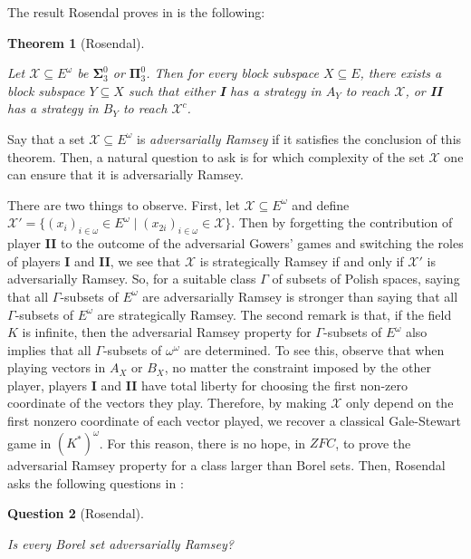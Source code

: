 \documentclass[a4paper,11pt]{article}
\newtheorem{thm}{Theorem}[section]
\newtheorem{question}[thm]{Question}
\theoremstyle{definition}
\numberwithin{equation}{section}
\newcommand{\X}{\mathcal{X}}
\newcommand{\I}{\textbf{I}}
\newcommand{\II}{\textbf{II}}
\begin{document}
The result Rosendal proves in \cite{Rosendaladverse} is the following:

\begin{thm}[Rosendal]\label{Adversarialconcrete}

Let $\X \subseteq E^\omega$ be $\boldsymbol{\Sigma}_3^0$ or $\boldsymbol{\Pi}_3^0$. Then for every block subspace $X \subseteq E$, there exists a block subspace $Y \subseteq X$ such that either \I{} has a strategy in $A_Y$ to reach $\X$, or \II{} has a strategy in $B_Y$ to reach $\X^c$.

\end{thm}

Say that a set $\X \subseteq E^\omega$ is \emph{adversarially Ramsey} if it satisfies the conclusion of this theorem. Then, a natural question to ask is for which complexity of the set $\X$ one can ensure that it is adversarially Ramsey.

\smallskip

There are two things to observe. First, let $\X \subseteq E^\omega$ and define $\X' = \{(x_i)_{i \in \omega} \in E^\omega \mid (x_{2i})_{i \in \omega} \in \X\}$. Then by forgetting the contribution of player \II{} to the outcome of the adversarial Gowers' games and switching the roles of players \I{} and \II{}, we see that $\X$ is strategically Ramsey if and only if $\X'$ is adversarially Ramsey. So, for a suitable class $\Gamma$ of subsets of Polish spaces, saying that all $\Gamma$-subsets of $E^\omega$ are adversarially Ramsey is stronger than saying that all $\Gamma$-subsets of $E^\omega$ are strategically Ramsey. The second remark is that, if the field $K$ is infinite, then the adversarial Ramsey property for $\Gamma$-subsets of $E^\omega$ also implies that all $\Gamma$-subsets of $\omega^\omega$ are determined. To see this, observe that when playing vectors in $A_X$ or $B_X$, no matter the constraint imposed by the other player, players \I{} and \II{} have total liberty for choosing the first non-zero coordinate of the vectors they play. Therefore, by making $\X$ only depend on the first nonzero coordinate of each vector played, we recover a classical Gale-Stewart game in $(K^*)^\omega$. For this reason, there is no hope, in $ZFC$, to prove the adversarial Ramsey property for a class larger than Borel sets. Then, Rosendal asks the following questions in \cite{Rosendaladverse}:

\begin{question}[Rosendal]\label{mainvector}

Is every Borel set adversarially Ramsey?

\end{question}
\end{document}
